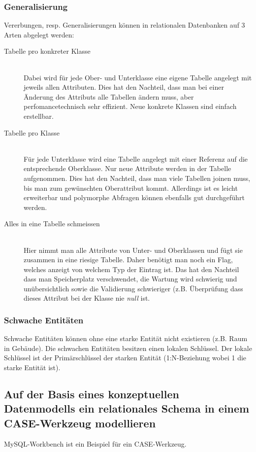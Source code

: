 \subsubsection{Generalisierung}
\label{sec:generalisierung}
Vererbungen, resp. Generalisierungen können in relationalen Datenbanken auf 3 Arten abgelegt werden:
\begin{description}
  \item[Tabelle pro konkreter Klasse] \hfill \\
  Dabei wird für jede Ober- und Unterklasse eine eigene Tabelle angelegt mit jeweils allen Attributen. Dies hat den Nachteil, dass man bei einer Änderung des Attributs alle Tabellen ändern muss, aber perfomancetechnisch sehr effizient. Neue konkrete Klassen sind einfach erstellbar.
  \item[Tabelle pro Klasse] \hfill \\
  Für jede Unterklasse wird eine Tabelle angelegt mit einer Referenz auf die entsprechende Oberklasse. Nur neue Attribute werden in der Tabelle aufgenommen. Dies hat den Nachteil, dass man viele Tabellen joinen muss, bis man zum gewünschten Oberattribut kommt. Allerdings ist es leicht erweiterbar und polymorphe Abfragen können ebenfalls gut durchgeführt werden.
  \item[Alles in eine Tabelle schmeissen] \hfill \\
  Hier nimmt man alle Attribute von Unter- und Oberklassen und fügt sie zusammen in eine riesige Tabelle. Daher benötigt man noch ein Flag, welches anzeigt von welchem Typ der Eintrag ist. Das hat den Nachteil dass man Speicherplatz verschwendet, die Wartung wird schwierig und unübersichtlich sowie die Validierung schwieriger (z.B. Überprüfung dass dieses Attribut bei der Klasse nie \emph{null} ist.
\end{description}


\subsubsection{Schwache Entitäten}

Schwache Entitäten können ohne eine starke Entität nicht existieren (z.B. Raum in Gebäude). Die schwachen Entitäten besitzen einen lokalen Schlüssel. Der lokale Schlüssel ist der Primärschlüssel der starken Entität (1:N-Beziehung wobei 1 die starke Entität ist). 

\subsection{Auf der Basis eines konzeptuellen Datenmodells ein relationales Schema in einem CASE-Werkzeug modellieren}

MySQL-Workbench ist ein Beispiel für ein \ac{CASE}-Werkzeug.